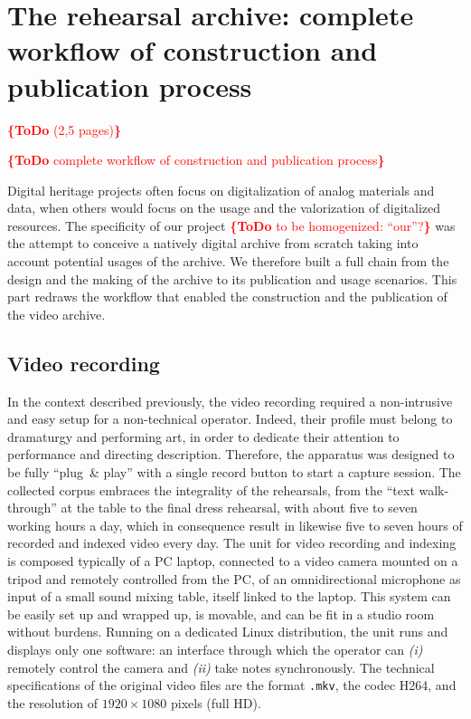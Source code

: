 \documentclass[conference]{IEEEtran}
\newcommand{\todo}[1]{\noindent\textcolor{red}{{\bf \{ToDo} #1{\bf \}}}}
\begin{document}
\section{The rehearsal archive: complete workflow of construction and publication process}
\todo{(2,5 pages)}

\todo{complete workflow of construction and publication process}

Digital heritage projects often focus on digitalization of analog materials and data,
when others would focus on the usage and the valorization of digitalized resources.
The specificity of our project \todo{to be homogenized: ``our''?}
was the attempt to conceive a natively digital archive from scratch
taking into account potential usages of the archive.
We therefore built a full chain from the design and the making of the archive
to its publication and usage scenarios.
This part redraws the workflow that enabled the construction and the publication of the video archive.

\subsection{Video recording}
In the context described previously, the video recording required a non-intrusive and easy setup for a non-technical operator. Indeed, their profile must belong to dramaturgy and performing art, in order to dedicate their attention to performance and directing description. Therefore, the apparatus was designed to be fully ``plug\ \& play'' with a single record button to start a capture session.
The collected corpus embraces the integrality of the rehearsals, from the ``text walk-through'' at the table to the final dress rehearsal, with about five to seven working hours a day, which in consequence result in likewise five to seven hours of recorded and indexed video every day.
The unit for video recording and indexing is composed typically of a PC laptop, connected to a video camera mounted on a tripod and remotely controlled from the PC, of an omnidirectional microphone as input of a small sound mixing table, itself linked to the laptop. This system can be easily set up and wrapped up, is movable, and can be fit in a studio room without burdens. Running on a dedicated Linux distribution, the unit runs and displays only one software: an interface through which the operator can \emph{(i)} remotely control the camera and \emph{(ii)} take notes synchronously. 
The technical specifications of the original video files are the format \texttt{.mkv}, the codec H264, and the resolution of $1920 \times 1080$ pixels (full HD).
\end{document}
